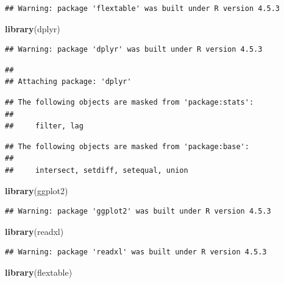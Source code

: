 \documentclass[
]{article}
\newenvironment{Shaded}{\begin{snugshade}}{\end{snugshade}}
\newcommand{\FunctionTok}[1]{\textcolor[rgb]{0.13,0.29,0.53}{\textbf{#1}}}
\newcommand{\NormalTok}[1]{#1}
\begin{document}
\begin{verbatim}
## Warning: package 'flextable' was built under R version 4.5.3
\end{verbatim}

\begin{Shaded}
\begin{Highlighting}[]
\FunctionTok{library}\NormalTok{(dplyr)}
\end{Highlighting}
\end{Shaded}

\begin{verbatim}
## Warning: package 'dplyr' was built under R version 4.5.3
\end{verbatim}

\begin{verbatim}
## 
## Attaching package: 'dplyr'
\end{verbatim}

\begin{verbatim}
## The following objects are masked from 'package:stats':
## 
##     filter, lag
\end{verbatim}

\begin{verbatim}
## The following objects are masked from 'package:base':
## 
##     intersect, setdiff, setequal, union
\end{verbatim}

\begin{Shaded}
\begin{Highlighting}[]
\FunctionTok{library}\NormalTok{(ggplot2)}
\end{Highlighting}
\end{Shaded}

\begin{verbatim}
## Warning: package 'ggplot2' was built under R version 4.5.3
\end{verbatim}

\begin{Shaded}
\begin{Highlighting}[]
\FunctionTok{library}\NormalTok{(readxl)}
\end{Highlighting}
\end{Shaded}

\begin{verbatim}
## Warning: package 'readxl' was built under R version 4.5.3
\end{verbatim}

\begin{Shaded}
\begin{Highlighting}[]
\FunctionTok{library}\NormalTok{(flextable)}
\end{Highlighting}
\end{Shaded}
\end{document}
